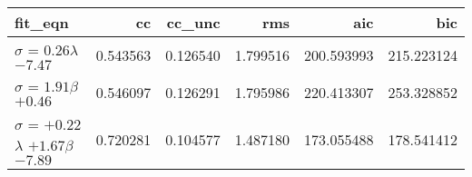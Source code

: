 \begin{tabular}{lrrrrr}
\toprule
fit_eqn & cc & cc_unc & rms & aic & bic \\
\midrule
$\sigma$ = $0.26$$\lambda$ $-7.47$ & 0.543563 & 0.126540 & 1.799516 & 200.593993 & 215.223124 \\
$\sigma$ = $1.91$$\beta$ $+0.46$ & 0.546097 & 0.126291 & 1.795986 & 220.413307 & 253.328852 \\
$\sigma$ = $+0.22$$\lambda$ $+1.67$$\beta$ $-7.89$ & 0.720281 & 0.104577 & 1.487180 & 173.055488 & 178.541412 \\
\bottomrule
\end{tabular}
